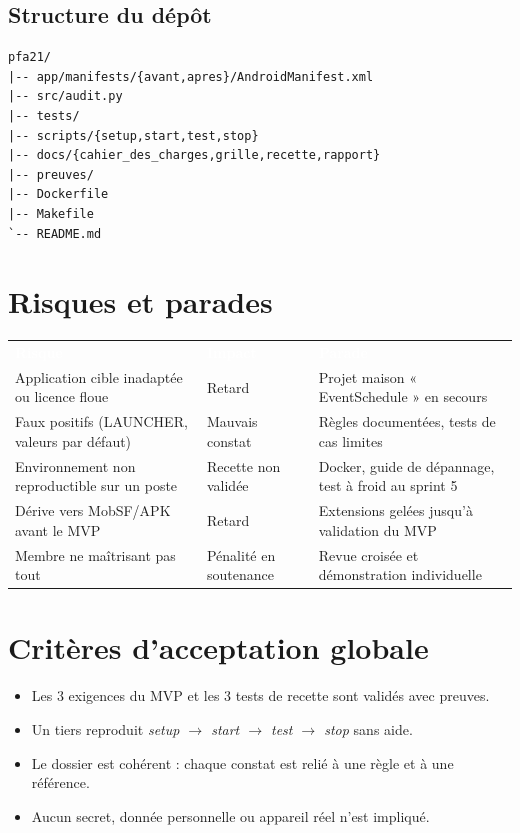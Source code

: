 \documentclass[11pt,a4paper]{article}
\newcommand{\hd}[1]{\textcolor{white}{\textbf{#1}}}
\begin{document}
\subsection{Structure du dépôt}
\begin{lstlisting}
pfa21/
|-- app/manifests/{avant,apres}/AndroidManifest.xml
|-- src/audit.py
|-- tests/
|-- scripts/{setup,start,test,stop}
|-- docs/{cahier_des_charges,grille,recette,rapport}
|-- preuves/
|-- Dockerfile
|-- Makefile
`-- README.md
\end{lstlisting}

\section{Risques et parades}
\begin{center}
\begin{tabular}{L{4.4cm}L{2.2cm}L{7.8cm}}
\hd{Risque} & \hd{Impact} & \hd{Parade}\\
Application cible inadaptée ou licence floue & Retard & Projet maison « EventSchedule » en secours\\
Faux positifs (LAUNCHER, valeurs par défaut) & Mauvais constat & Règles documentées, tests de cas limites\\
Environnement non reproductible sur un poste & Recette non validée & Docker, guide de dépannage, test à froid au sprint 5\\
Dérive vers MobSF/APK avant le MVP & Retard & Extensions gelées jusqu'à validation du MVP\\
Membre ne maîtrisant pas tout & Pénalité en soutenance & Revue croisée et démonstration individuelle\\
\end{tabular}
\end{center}

\section{Critères d'acceptation globale}
\begin{itemize}
  \item Les 3 exigences du MVP et les 3 tests de recette sont validés avec preuves.
  \item Un tiers reproduit \textit{setup $\rightarrow$ start $\rightarrow$ test $\rightarrow$ stop} sans aide.
  \item Le dossier est cohérent : chaque constat est relié à une règle et à une référence.
  \item Aucun secret, donnée personnelle ou appareil réel n'est impliqué.
\end{itemize}
\end{document}

